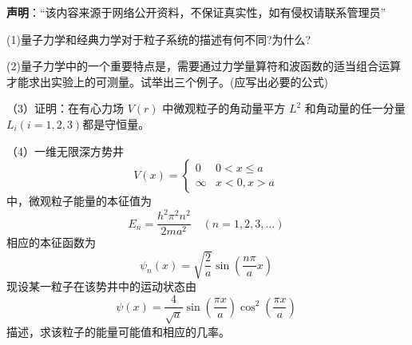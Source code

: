 
\textbf{声明}：“该内容来源于网络公开资料，不保证真实性，如有侵权请联系管理员”

(1)量子力学和经典力学对于粒子系统的描述有何不同?为什么?

(2)量子力学中的一个重要特点是，需要通过力学量算符和波函数的适当组合运算才能求出实验上的可测量。试举出三个例子。(应写出必要的公式)

（3）证明：在有心力场 $V(r)$ 中微观粒子的角动量平方 $ L^2 $ 和角动量的任一分量 $L_i (i=1,2,3)$都是守恒量。

（4）一维无限深方势井
$$V(x) = 
\begin{cases} 
0 & 0 < x \leq a \\
\infty & x < 0, x > a 
\end{cases}~$$
中，微观粒子能量的本征值为
$$E_n = \frac{h^2 \pi^2 n^2}{2ma^2} \quad (n = 1, 2, 3, \ldots)~$$
相应的本征函数为
$$\psi_n(x) = \sqrt{\frac{2}{a}} \sin \left( \frac{n \pi }{a} x \right)~$$
现设某一粒子在该势井中的运动状态由
$$\psi(x) = \frac{4}{\sqrt{a}} \sin \left( \frac{\pi x}{a} \right) \cos^2 \left( \frac{\pi x}{a} \right)~$$
描述，求该粒子的能量可能值和相应的几率。